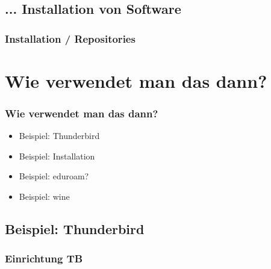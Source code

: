 \documentclass{beamer}
\begin{document}
        \subsection{... Installation von Software}
            \begin{frame}
          		\frametitle{Installation / Repositories}
        		\begin{minipage}{0.44\textwidth}
        		
        		\end{minipage}%
        		\begin{minipage}{0.54\textwidth}
        		
        		\end{minipage}
        	\end{frame}

    \section{Wie verwendet man das dann?}
        \begin{frame}
  		\frametitle{Wie verwendet man das dann?}
    		\begin{center}
        		\begin{minipage}{0.44\textwidth}
        		    \begin{itemize}
        		        \item Beispiel: Thunderbird
        		        \item Beispiel: Installation
        		        \item Beispiel: eduroam?
        		        \item Beispiel: wine
        		    \end{itemize}
        		\end{minipage}%
    		\end{center}
    	\end{frame}
    	
        \subsection{Beispiel: Thunderbird}
            \begin{frame}
          		\frametitle{Einrichtung TB}
        		\begin{minipage}{0.44\textwidth}
        		
        		\end{minipage}%
        		\begin{minipage}{0.54\textwidth}
        		
        		\end{minipage}
        	\end{frame}
        	
\end{document}
